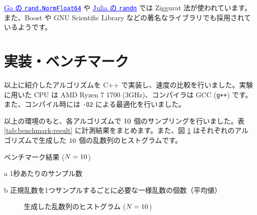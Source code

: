 \documentclass[twocolumn, dvipdfmx]{jsarticle}
\begin{document}
\href{https://github.com/golang/go/blob/be9379f8a8e2bfd924966020d177552d01833fdb/src/math/rand/normal.go}{\textcolor{blue}{\underline{Go の \texttt{rand.NormFloat64}}}} や \href{https://github.com/JuliaLang/julia/blob/ab05173c9539efb0aa82319f13672260a7b88076/stdlib/Random/src/normal.jl}{\textcolor{blue}{\underline{Julia の \texttt{randn}}}} では Ziggurat 法が使われています。また、Boost や GNU Scientific Library などの著名なライブラリでも採用されているようです。

\section*{実装・ベンチマーク}

以上に紹介したアルゴリズムを C++ で実装し、速度の比較を行いました。実験に用いた CPU は AMD Ryzen 7 1700 (3GHz)、コンパイラは GCC (\texttt{g++}) です。また、コンパイル時には \texttt{-O2} による最適化を行いました。

以上の環境のもと、各アルゴリズムで $10^{\protect}$ 個のサンプリングを行いました。表 \ref{tab:benchmark-result} に計測結果をまとめます。また、図 \ref{fig:histogram} はそれぞれのアルゴリズムで生成した $10^{\protect}$ 個の乱数列のヒストグラムです。

\begin{table}
    \caption{ベンチマーク結果 ($N = 10^{\protect}$)}
    \label{tab:benchmark-result}
    \begin{threeparttable}
        \centering
        
        \begin{tablenotes}
            \item[a] 1秒あたりのサンプル数
            \item[b] 正規乱数を1つサンプルするごとに必要な一様乱数の個数（平均値）
        \end{tablenotes}
    \end{threeparttable}
\end{table}

\begin{figure}[t]
    \centering
    \begin{subfigmatrix}{3}
    \end{subfigmatrix}
    \caption{生成した乱数列のヒストグラム ($N = 10^{\protect}$)}
    \label{fig:histogram}
\end{figure}
\end{document}

